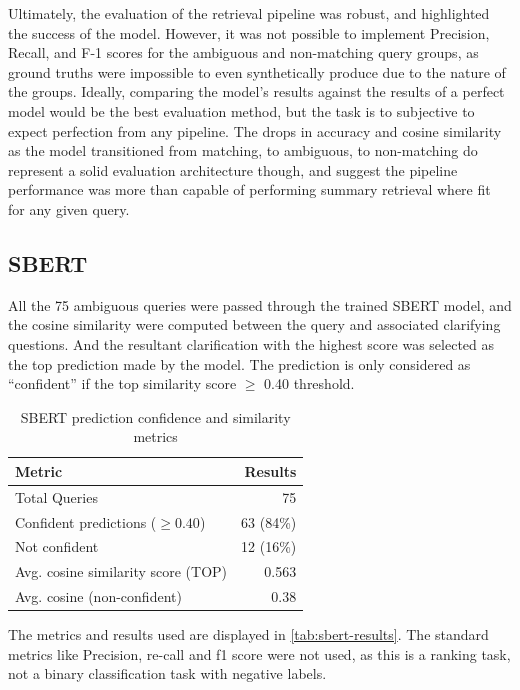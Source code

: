 \documentclass[11pt]{article}
\begin{document}
Ultimately, the evaluation of the retrieval pipeline was robust, and highlighted the success of the model. However, it was not possible to implement Precision, Recall, and F-1 scores for the ambiguous and non-matching query groups, as ground truths were impossible to even synthetically produce due to the nature of the groups. Ideally, comparing the model's results against the results of a perfect model would be the best evaluation method, but the task is to subjective to expect perfection from any pipeline. The drops in accuracy and cosine similarity as the model transitioned from matching, to ambiguous, to non-matching do represent a solid evaluation architecture though, and suggest the pipeline performance was more than capable of performing summary retrieval where fit for any given query.

\subsection{SBERT}
All the 75 ambiguous queries were passed through the trained SBERT model, and the cosine similarity were computed between the query and associated clarifying questions. And the resultant clarification with the highest score was selected as the top prediction made by the model. The prediction is only considered as “confident” if the top similarity score $\geq$ 0.40 threshold.

\begin{table}[h]
  \centering
  \begin{tabular}{l r}
  \textbf{Metric} & \textbf{Results} \\
  \hline
  Total Queries & 75 \\
  Confident predictions ($\geq 0.40$) & 63 (84\%) \\
  Not confident & 12 (16\%) \\
  Avg. cosine similarity score (TOP) & 0.563 \\
  Avg. cosine (non-confident) & 0.38 \\
  \hline
  \end{tabular}
  \caption{SBERT prediction confidence and similarity metrics}
  \label{tab:sbert-results}
\end{table}
  
The metrics and results used are displayed in \autoref{tab:sbert-results}. The standard metrics like Precision, re-call and f1 score were not used, as this is a ranking task, not a binary classification task with negative labels.
\end{document}
